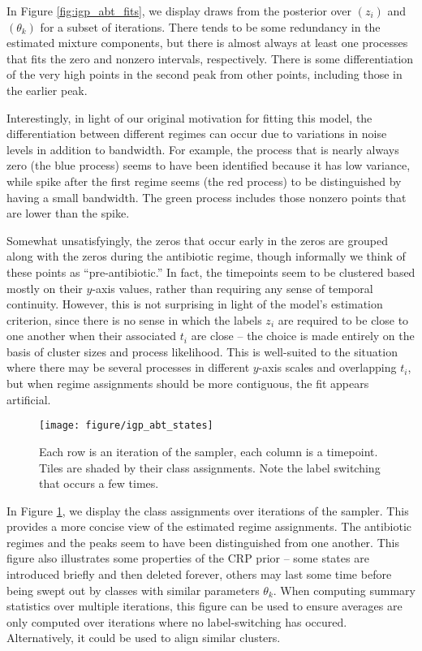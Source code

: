 \documentclass[14pt]{extreport}
\begin{document}
In Figure \ref{fig:igp_abt_fits}, we display draws from the posterior over
$\left(z_i\right)$ and $\left(\theta_k\right)$ for a subset of iterations. There
tends to be some redundancy in the estimated mixture components, but there is
almost always at least one processes that fits the zero and nonzero intervals,
respectively. There is some differentiation of the very high points in the
second peak from other points, including those in the earlier peak.

Interestingly, in light of our original motivation for fitting this model, the
differentiation between different regimes can occur due to variations in noise
levels in addition to bandwidth. For example, the process that is nearly always
zero (the blue process) seems to have been identified because it has low
variance, while spike after the first regime seems (the red process) to be
distinguished by having a small bandwidth. The green process includes those
nonzero points that are lower than the spike.

Somewhat unsatisfyingly, the zeros that occur early in the zeros are grouped
along with the zeros during the antibiotic regime, though informally we think of
these points as ``pre-antibiotic.'' In fact, the timepoints seem to be clustered
based mostly on their $y$-axis values, rather than requiring any sense of
temporal continuity. However, this is not surprising in light of the model's
estimation criterion, since there is no sense in which the labels $z_i$ are
required to be close to one another when their associated $t_i$ are close -- the
choice is made entirely on the basis of cluster sizes and process likelihood.
This is well-suited to the situation where there may be several processes in
different $y$-axis scales and overlapping $t_i$, but when regime assignments
should be more contiguous, the fit appears artificial.

\begin{figure}
  \centering
  \texttt{[image: figure/igp\_abt\_states]}
  \caption{Each row is an iteration of the sampler, each column is a timepoint.
    Tiles are shaded by their class assignments. Note the label switching that
    occurs a few times. \label{fig:igp_abt_states} }
\end{figure}

In Figure \ref{fig:igp_abt_states}, we display the class assignments over
iterations of the sampler. This provides a more concise view of the estimated
regime assignments. The antibiotic regimes and the peaks seem to have been
distinguished from one another. This figure also illustrates some properties of
the CRP prior -- some states are introduced briefly and then deleted forever,
others may last some time before being swept out by classes with similar
parameters $\theta_k$. When computing summary statistics over multiple
iterations, this figure can be used to ensure averages are only computed over
iterations where no label-switching has occured. Alternatively, it could be used
to align similar clusters.
\end{document}
